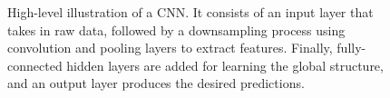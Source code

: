 \begin{figure}[ht]
    \caption{\small{High-level illustration of a CNN. It consists of an input layer that takes in raw data, followed by a downsampling process using convolution and pooling layers to extract features. Finally, fully-connected hidden layers are added for learning the global structure, and an output layer produces the desired predictions.}}
    \label{fig: CNN colour diagram}
\end{figure}